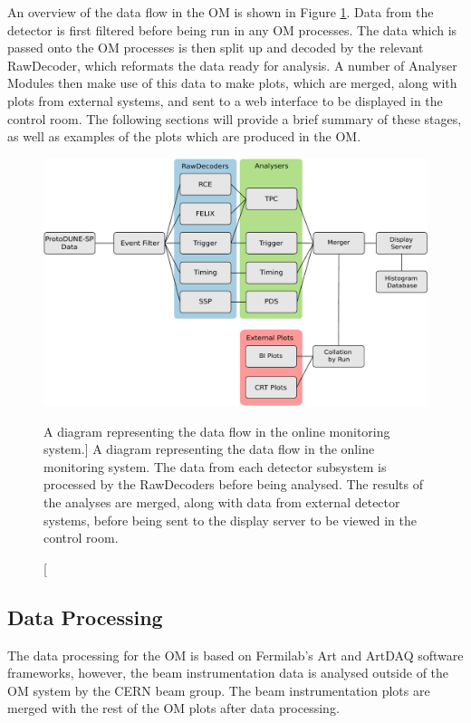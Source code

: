 An overview of the data flow in the OM is shown in Figure \ref{fig:om_flow}. 
Data from the detector is first filtered before being run in any OM processes. 
The data which is passed onto the OM processes is then split up and decoded by 
the relevant RawDecoder, which reformats the data ready for analysis. A number 
of Analyser Modules then make use of this data to make plots, which are merged,
along with plots from external systems, and sent to a web interface to be 
displayed in the control room. The following sections will provide a brief 
summary of these stages, as well as examples of the plots which are produced in
the OM.

\begin{figure}
	\centering
	\includegraphics[width=\textwidth]{figures/om_flow.pdf}
	\caption
	[A diagram representing the data flow in the \protodune{} online monitoring system.]
	{A diagram representing the data flow in the \protodune{} online monitoring
	system. The data from each detector subsystem is processed by the RawDecoders
	before being analysed. The results of the analyses are merged, along with data
	from external detector systems, before being sent to the display server to be
	viewed in the control room.}
	\label{fig:om_flow}
\end{figure}

\subsection{Data Processing}
The data processing for the OM is based on Fermilab's Art and ArtDAQ software
frameworks\cite{Green:2012gv, 6495515}, however, the beam instrumentation data 
is analysed outside of the OM system by the CERN beam group. The beam 
instrumentation plots are merged with the rest of the OM plots after data 
processing.

